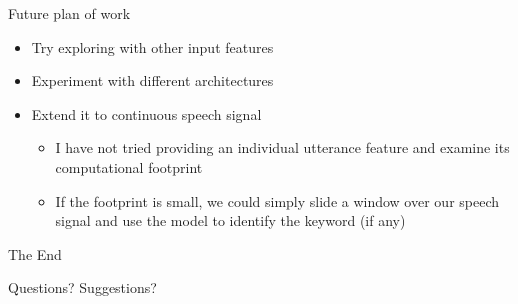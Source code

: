 \documentclass{beamer}
\begin{document}
\begin{frame}{Future plan of work}
    \begin{itemize}
        \item<1-> Try exploring with other input features
		\item<2-> Experiment with different architectures
		\item<3-> Extend it to continuous speech signal
			\begin{itemize}
				\item I have not tried providing an individual utterance feature and examine its computational footprint
				\item If the footprint is small, we could simply slide a window over our speech signal and use the model to identify the keyword (if any)
			\end{itemize}
	\end{itemize}
\end{frame}



\begin{frame}
\huge{\centerline{The End}}
\hspace{10em}
\huge{\centerline{Questions? Suggestions?}}
\end{frame}
\end{document}
